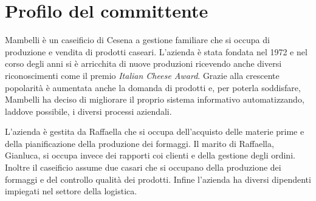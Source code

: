 \section{Profilo del committente}\label{sec:profilo-del-committente}
Mambelli è un caseificio di Cesena a gestione familiare che si occupa di produzione e vendita di prodotti caseari. L'azienda è stata fondata nel 1972 e nel corso degli anni si è arricchita di nuove produzioni ricevendo anche diversi riconoscimenti come il premio \emph{Italian Cheese Award}. 
Grazie alla crescente popolarità è aumentata anche la domanda di prodotti e, per poterla soddisfare, Mambelli ha deciso di migliorare il proprio sistema informativo automatizzando, laddove possibile, i diversi processi aziendali.

L'azienda è gestita da Raffaella che si occupa dell'acquisto delle materie prime e della pianificazione della produzione dei formaggi. Il marito di Raffaella, Gianluca, si occupa invece dei rapporti coi clienti e della gestione degli ordini. Inoltre il caseificio assume due casari che si occupano della produzione dei formaggi e del controllo qualità dei prodotti. Infine l'azienda ha diversi dipendenti impiegati nel settore della logistica.

